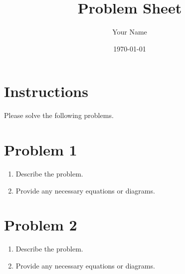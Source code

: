 \documentclass[a4paper,12pt]{article}
\title{Problem Sheet}
\author{Your Name}
\date{\today}
\begin{document}
\maketitle

\section*{Instructions}
Please solve the following problems.

\section{Problem 1}
\begin{enumerate}
    \item Describe the problem.
    \item Provide any necessary equations or diagrams.
\end{enumerate}

\section{Problem 2}
\begin{enumerate}
    \item Describe the problem.
    \item Provide any necessary equations or diagrams.
\end{enumerate}
\end{document}
